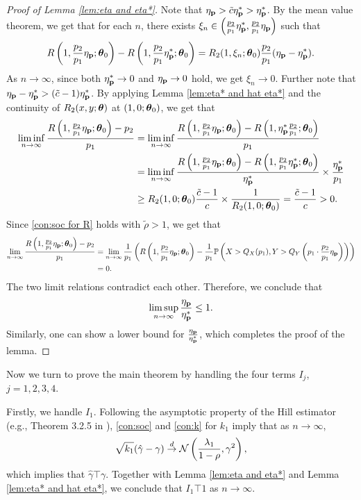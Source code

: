 \begin{proof}[Proof of Lemma \ref{lem:eta and eta*}]
Note that $\eta_{\mathbf p}>\tilde c \eta^*_{\mathbf p}>\eta^*_{\mathbf p}$. By the mean value theorem, we get that for each $n$, there exists $\xi_n\in\left(\frac{p_2}{p_1}\eta^*_{\mathbf p},\frac{p_2}{p_1}\eta_{\mathbf p}\right)$ such that 
\begin{equation} \label{eq:compare eta and eta*}
R\left(1,\frac{p_2}{p_1}\eta_{\mathbf p};\boldsymbol{\theta}_0\right) -R\left(1,\frac{p_2}{p_1}\eta^*_{\mathbf p};\boldsymbol{\theta}_0\right) =R_2(1,\xi_n;\boldsymbol{\theta}_0)\frac{p_2}{p_1}(\eta_{\mathbf p}-\eta^*_{\mathbf p}).
\end{equation}
As $n\to\infty$, since both $\eta^*_{\mathbf p}\to 0$ and $\eta_{\mathbf p}\to 0$ hold, we get $\xi_n\to 0$. Further note that $\eta_{\mathbf p}-\eta^*_{\mathbf p}>(\tilde c-1)\eta^*_{\mathbf p}$. By applying Lemma \ref{lem:eta* and hat eta*} and the continuity of $R_2(x,y;\boldsymbol{\theta})$ at $(1,0;\boldsymbol{\theta}_0)$, we get that 
\begin{align*}
\liminf_{n\to\infty}\frac{R\left(1,\frac{p_2}{p_1}\eta_{\mathbf p};\boldsymbol{\theta}_0\right) -p_2}{p_1}&=\liminf_{n\to\infty}\frac{R\left(1,\frac{p_2}{p_1}\eta_{\mathbf p};\boldsymbol{\theta}_0\right) -R\left(1,\eta^*_{\mathbf p}\frac{p_2}{p_1};\boldsymbol{\theta}_0\right)}{p_1}\\
&=\liminf_{n\to\infty}\frac{R\left(1,\frac{p_2}{p_1}\eta_{\mathbf p};\boldsymbol{\theta}_0\right) -R\left(1,\frac{p_2}{p_1}\eta^*_{\mathbf p};\boldsymbol{\theta}_0\right)}{\eta^*_{\mathbf p}}\times\frac{\eta^*_{\mathbf p}}{p_1}\\
&\geq R_2(1,0;\boldsymbol{\theta}_0)\frac{\tilde c-1}{c}\times \frac{1}{R_2(1,0;\boldsymbol{\theta}_0)}=\frac{\tilde c-1}{c}>0.
\end{align*}
Since \ref{con:soc for R} holds with $\tilde\rho>1$, we get that
\begin{align*}
    \lim_{n\to\infty}\frac{R\left(1,\frac{p_2}{p_1}\eta_{\mathbf p};\boldsymbol{\theta}_0\right) -p_2}{p_1}&=\lim_{n\to\infty}\frac{1}{p_1}\left(R\left(1,\frac{p_2}{p_1}\eta_{\mathbf p};\boldsymbol{\theta}_0\right)-\frac{1}{p_1}{\mathbb P}\left(X>Q_X(p_1),Y>Q_Y\left(p_1\cdot\frac{p_2}{p_1}\eta_{\mathbf p}\right)\right)\right)\\
    &=0.  
\end{align*}
The two limit relations contradict each other. Therefore, we conclude that $$\limsup_{n\to\infty}\frac{\eta_{\mathbf p}}{\eta^*_{\mathbf p}}\leq 1.$$
Similarly, one can show a lower bound for $\frac{\eta_{\mathbf p}}{\eta^*_{\mathbf p}}$, which completes the proof of the lemma.
\end{proof}

Now we turn to prove the main theorem by handling the four terms $I_j$, $j=1,2,3,4$.

Firstly, we handle $I_1$. Following the asymptotic property of the Hill estimator (e.g., Theorem 3.2.5 in \cite{dHF2006_sup}), \ref{con:soc} and \ref{con:k} for $k_1$ imply that as $n\to\infty$, 
\begin{equation}\label{eq:asymptotic Hill}
    \sqrt{k_1}(\hat\gamma-\gamma)\stackrel{d}{\to} {\cal N}\left(\frac{\lambda_1}{1-\rho},\gamma^2\right),
\end{equation}
which implies that
$\hat\gamma\top \gamma$. Together with Lemma \ref{lem:eta and eta*} and Lemma \ref{lem:eta* and hat eta*}, we conclude that $I_1\top 1$ as $n\to\infty$.

